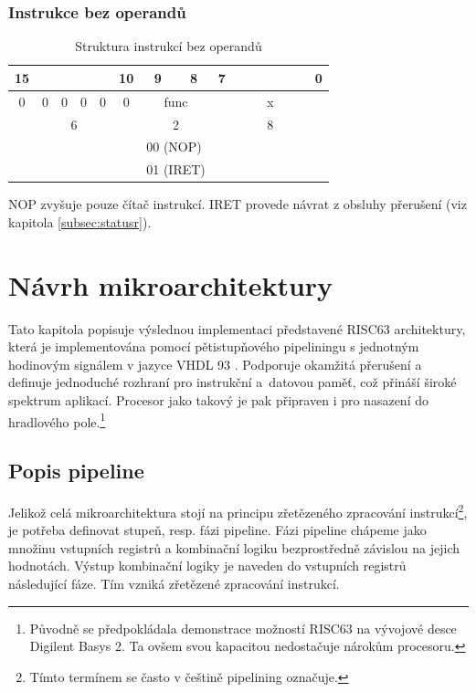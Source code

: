 \documentclass[
  digital, %
  color,   %
  table,   %
  twoside, %
  nolof,   %
  nolot,   %
]{fithesis3}
\begin{document}
\subsection{Instrukce bez operandů}
\begin{table}[H]
\caption{Struktura instrukcí bez operandů}
\begin{tabular}{clllllccccllclll}
15 & \multicolumn{1}{c}{} & \multicolumn{1}{c}{} & \multicolumn{1}{c}{} & \multicolumn{1}{c}{} & \multicolumn{1}{c}{10} & 9 & 8 & 7 &  & \multicolumn{1}{c}{} & \multicolumn{1}{c}{} &  & \multicolumn{1}{c}{} & \multicolumn{1}{c}{} & \multicolumn{1}{c}{0} \\ \hline
\multicolumn{1}{|c}{0} & \multicolumn{1}{c}{0} & \multicolumn{1}{c}{0} & \multicolumn{1}{c}{0} & \multicolumn{1}{c}{0} & \multicolumn{1}{c|}{0} & \multicolumn{2}{c|}{func} & \multicolumn{8}{c|}{x} \\ \hline
\multicolumn{6}{c}{{\color[HTML]{656565} 6}} & \multicolumn{2}{c}{{\color[HTML]{656565} 2}} & \multicolumn{8}{c}{{\color[HTML]{656565} 8}} \\
\multicolumn{1}{l}{} &  &  &  &  &  & \multicolumn{2}{l}{00 (NOP)} & \multicolumn{1}{l}{} &  &  &  &  &  &  &  \\
\multicolumn{1}{l}{} &  &  &  &  &  & \multicolumn{2}{l}{01 (IRET)} & \multicolumn{1}{l}{} & \multicolumn{1}{l}{} &  &  & \multicolumn{1}{l}{} &  &  & 
\end{tabular}
\end{table}

NOP zvyšuje pouze čítač instrukcí. IRET provede návrat z obsluhy přerušení (viz kapitola \ref{subsec:statusr}).

\chapter{Návrh mikroarchitektury}
Tato kapitola popisuje výslednou implementaci představené RISC63 architektury, která je implementována pomocí pětistupňového pipeliningu s jednotným hodinovým signálem v jazyce VHDL 93 \parencite{vhdl94}. Podporuje okamžitá přerušení a definuje jednoduché rozhraní pro instrukční a~datovou paměť, což přináší široké spektrum aplikací. Procesor jako takový je pak připraven i pro nasazení do hradlového pole.\footnote{Původně se předpokládala demonstrace možností RISC63 na vývojové desce Digilent Basys 2. Ta ovšem svou kapacitou nedostačuje nárokům procesoru.}

\section{Popis pipeline}
Jelikož celá mikroarchitektura stojí na principu zřetězeného zpracování instrukcí\footnote{Tímto termínem se často v češtině pipelining označuje.}, je potřeba definovat stupeň, resp. fázi pipeline. Fázi pipeline chápeme jako množinu vstupních registrů a kombinační logiku bezprostředně závislou na jejich hodnotách. Výstup kombinační logiky je naveden do vstupních registrů následující fáze. Tím vzniká zřetězené zpracování instrukcí.
\end{document}
